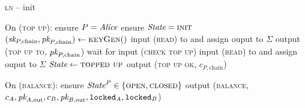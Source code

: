 \begin{center}
\begin{processbox}{\textsc{ln} -- init}
\begin{algorithmic}[1]
      \State On (\textsc{top up}):
      \Indent
        \State ensure $P = \mathit{Alice}$ 
        \State ensure $\itistate = \textsc{init}$
        \label{code:ln:init:change-state}
        \State $(\textit{sk}_{P, \mathrm{chain}}, \textit{pk}_{P, \mathrm{chain}}) \gets
        \textsc{keyGen}()$
        \State input (\textsc{read}) to \ledger and assign ouput to $\Sigma$
        \State output (\textsc{top up to}, $\textit{pk}_{P, \mathrm{chain}}$)
          \State {}
          \State wait for input (\textsc{check top up})
          \State input (\textsc{read}) to \ledger and assign ouput to $\Sigma$
        \EndWhile
        \State $\itistate \gets \textsc{topped up}$
        \State output (\textsc{top up ok}, $c_{P, \mathrm{chain}}$)
      \EndIndent
      \Statex

      \State On (\textsc{balance}):
      \Indent
        \State ensure $\mathit{State}^P \in \{\textsc{open}, \textsc{closed}\}$
        \label{code:functionality:chan:skeleton:base:balance:start}
        \State output (\textsc{balance}, $c_A, \textit{pk}_{A, \mathrm{out}}, c_B, \textit{pk}_{B,
        \mathrm{out}}, \texttt{locked}_A, \texttt{locked}_B$)
        \label{code:functionality:chan:skeleton:base:balance:end}
      \EndIndent
    \end{algorithmic}
  \end{processbox}
  \label{code:ln:init}
\end{center} \ \\

